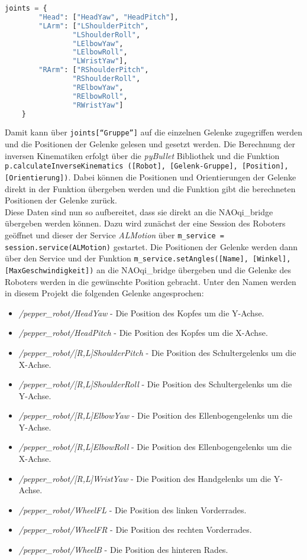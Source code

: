 \begin{lstlisting}[language=Python, caption=Gelenk-Grupperierung, label=lst:gelenk-grupperierung]
    joints = {
        "Head": ["HeadYaw", "HeadPitch"],
        "LArm": ["LShoulderPitch",
                "LShoulderRoll",
                "LElbowYaw",
                "LElbowRoll",
                "LWristYaw"],
        "RArm": ["RShoulderPitch",
                "RShoulderRoll",
                "RElbowYaw",
                "RElbowRoll",
                "RWristYaw"]
    }
\end{lstlisting}
Damit kann über \texttt{joints[``Gruppe'']} auf die einzelnen Gelenke zugegriffen werden und die Positionen der Gelenke gelesen und gesetzt werden. Die Berechnung der inversen Kinematiken erfolgt über die \textit{pyBullet} Bibliothek und die Funktion \texttt{p.calculateInverseKinematics ([Robot], [Gelenk-Gruppe], [Position], [Orientierung])}. Dabei können die Positionen und Orientierungen der Gelenke direkt in der Funktion übergeben werden und die Funktion gibt die berechneten Positionen der Gelenke zurück.\\
Diese Daten sind nun so aufbereitet, dass sie direkt an die NAOqi\_bridge übergeben werden können. Dazu wird zunächst der eine Session des Roboters geöffnet und dieser der Service \textit{ALMotion} über \texttt{m\_service = session.service(ALMotion)} gestartet. Die Positionen der Gelenke werden dann über den Service und der Funktion \texttt{m\_service.setAngles([Name], [Winkel], [MaxGeschwindigkeit])} an die NAOqi\_bridge übergeben und die Gelenke des Roboters werden in die gewünschte Position gebracht. Unter den Namen werden in diesem Projekt die folgenden Gelenke angesprochen:
\begin{itemize}
    \item \textit{/pepper\_robot/HeadYaw} - Die Position des Kopfes um die Y-Achse.
    \item \textit{/pepper\_robot/HeadPitch} - Die Position des Kopfes um die X-Achse.
    \item \textit{/pepper\_robot/[R,L]ShoulderPitch} - Die Position des Schultergelenks um die X-Achse.
    \item \textit{/pepper\_robot/[R,L]ShoulderRoll} - Die Position des Schultergelenks um die Y-Achse.
    \item \textit{/pepper\_robot/[R,L]ElbowYaw} - Die Position des Ellenbogengelenks um die Y-Achse.
    \item \textit{/pepper\_robot/[R,L]ElbowRoll} - Die Position des Ellenbogengelenks um die X-Achse.
    \item \textit{/pepper\_robot/[R,L]WristYaw} - Die Position des Handgelenks um die Y-Achse.
    \item \textit{/pepper\_robot/WheelFL} - Die Position des linken Vorderrades.
    \item \textit{/pepper\_robot/WheelFR} - Die Position des rechten Vorderrades.
    \item \textit{/pepper\_robot/WheelB} - Die Position des hinteren Rades.
\end{itemize}

